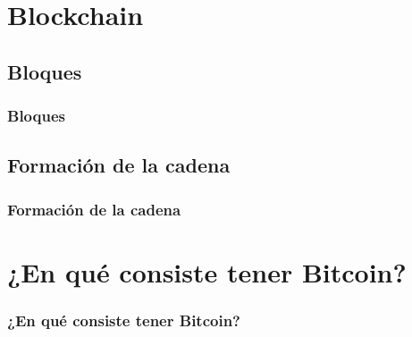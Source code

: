 \documentclass{beamer}
\theoremstyle{definition}
\begin{document}
\section{Blockchain}
\subsection{Bloques}
\begin{frame}
	\frametitle{Bloques}
\end{frame}

\subsection{Formación de la cadena}
\begin{frame}
	\frametitle{Formación de la cadena}
\end{frame}


\section{¿En qué consiste tener Bitcoin?}
\begin{frame}
	\frametitle{¿En qué consiste tener Bitcoin?}
\end{frame}
\end{document}
